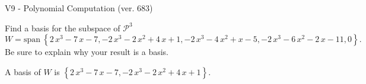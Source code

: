 \begin{exercise}
  \begin{exerciseTitle}V9 - Polynomial Computation (ver. 683)\end{exerciseTitle}
  \begin{exerciseStatement}
    Find a basis for the subspace of \(\mathcal{P}^3\) 
\[W=\mathrm{span}\ \left\{2 \, x^{3} - 7 \, x - 7 , -2 \, x^{3} - 2 \, x^{2} + 4 \, x + 1 , -2 \, x^{3} - 4 \, x^{2} + x - 5 , -2 \, x^{3} - 6 \, x^{2} - 2 \, x - 11 , 0\right\}.\]
 Be sure to explain why your result is a basis.


  \end{exerciseStatement}
  \begin{exerciseAnswer}
   A basis of \(W\) is  \(\left\{2 \, x^{3} - 7 \, x - 7 , -2 \, x^{3} - 2 \, x^{2} + 4 \, x + 1\right\}\).
  


  \end{exerciseAnswer}
\end{exercise}